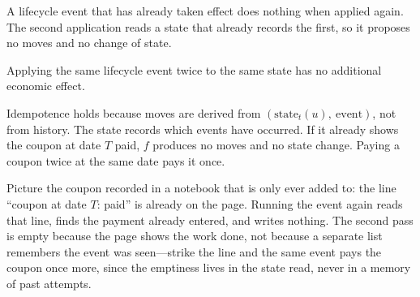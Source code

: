 A lifecycle event that has already taken effect does nothing when applied again. The second application reads a state that already records the first, so it proposes no moves and no change of state.

\begin{principle}[Idempotence]
\label{prin:idempotence}
Applying the same lifecycle event twice to the same state has no additional economic effect.
\end{principle}

Idempotence holds because moves are derived from $(\text{state}_t(u),\ \text{event})$, not from history. The state records which events have occurred. If it already shows the coupon at date $T$ paid, $f$ produces no moves and no state change. Paying a coupon twice at the same date pays it once.

\begin{mentalmodel}
Picture the coupon recorded in a notebook that is only ever added to: the line ``coupon at date $T$: paid'' is already on the page. Running the event again reads that line, finds the payment already entered, and writes nothing. The second pass is empty because the page shows the work done, not because a separate list remembers the event was seen---strike the line and the same event pays the coupon once more, since the emptiness lives in the state read, never in a memory of past attempts.
\end{mentalmodel}

